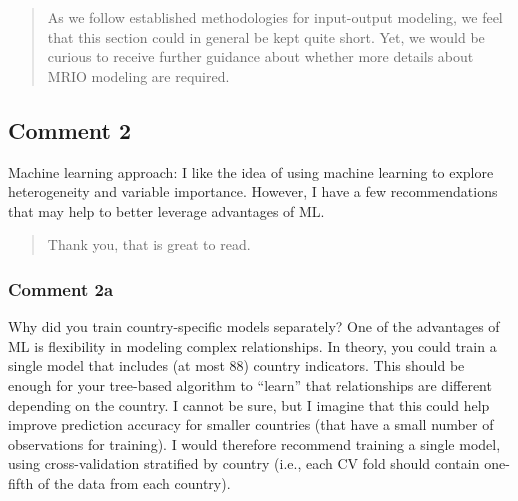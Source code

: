 \documentclass[11pt]{article}
\newenvironment{response}
{\begin{quote}\color{black}}
{\end{quote}}
\begin{document}
\begin{response}
    As we follow established methodologies for input-output modeling, we feel that this section could in general be kept quite short. Yet, we would be curious to receive further guidance about whether more details about MRIO modeling are required.
\end{response}

\subsection*{Comment 2}\label{comment_R2_2}

\begin{commentbox}
    Machine learning approach: I like the idea of using machine learning to explore heterogeneity and variable importance. However, I have a few recommendations that may help to better leverage advantages of ML.
\end{commentbox}

\begin{response}
    Thank you, that is great to read.
\end{response}

\subsubsection*{Comment 2a}\label{comment_R2_2a}

\begin{commentbox}
    Why did you train country-specific models separately? One of the advantages of ML is flexibility in modeling complex relationships. In theory, you could train a single model that includes (at most 88) country indicators. This should be enough for your tree-based algorithm to “learn” that relationships are different depending on the country. I cannot be sure, but I imagine that this could help improve prediction accuracy for smaller countries (that have a small number of observations for training). I would therefore recommend training a single model, using cross-validation stratified by country (i.e., each CV fold should contain one-fifth of the data from each country).
\end{commentbox}
\end{document}
